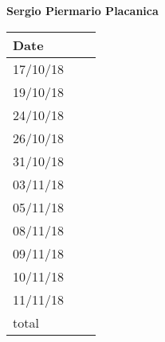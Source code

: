 \documentclass[../main.tex]{subfiles}
\begin{document}
\begin{center}
	{\bf Sergio Piermario Placanica}
	\vspace{2mm}

		\begin{tabular}{p{1.3cm}|p{1.8cm}|p{6.7cm}}
			\hline
			\bf Date & \bf \makebox[1.8cm][c]{Hours} & \bf \makebox[6.7cm][c]{Description} \\
			\hline
			17/10/18 & \makebox[1.8cm][c]{2h} & \makebox[6.7cm][c]{Introduction}\\
			19/10/18 & \makebox[1.8cm][c]{3h} & \makebox[6.7cm][c]{Goals, Requirements, Domain assumptions}\\
			24/10/18 & \makebox[1.8cm][c]{4h} & \makebox[6.7cm][c]{Goals, Requirements, Domain assumptions}\\
			26/10/18 & \makebox[1.8cm][c]{2h} & \makebox[6.7cm][c]{Purpose, Scope}\\
			31/10/18 & \makebox[1.8cm][c]{4h} & \makebox[6.7cm][c]{Mockups}\\
			03/11/18 & \makebox[1.8cm][c]{4h} & \makebox[6.7cm][c]{Mockups}\\
			05/11/18 & \makebox[1.8cm][c]{1h} & \makebox[6.7cm][c]{Scenarios, Sequence Diagram}\\
			08/11/18 & \makebox[1.8cm][c]{4h} & \makebox[6.7cm][c]{Mockups, Sequence Diagramm, Alloy}\\
			09/11/18 & \makebox[1.8cm][c]{4h} & \makebox[6.7cm][c]{Alloy, Performance Requirements}\\
			10/11/18 & \makebox[1.8cm][c]{4h} & \makebox[6.7cm][c]{Performance Requirements, Revisioning}\\
			11/11/18 & \makebox[1.8cm][c]{4h} & \makebox[6.7cm][c]{Revisioning}\\
			total    & \makebox[1.8cm][c]{36h}
		\end{tabular}
\end{center}
\end{document}
